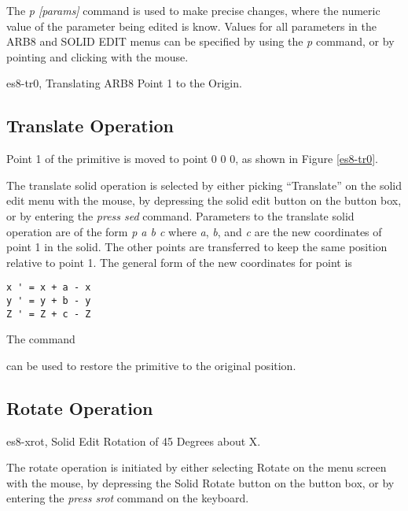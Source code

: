 The {\em p [params]} command is used to
make precise changes, where the numeric value of the parameter being
edited is know.
Values for all parameters in the ARB8
and SOLID EDIT menus can be specified by using the {\em p} command,
or by pointing and clicking with the mouse.

\mfig es8-tr0, Translating ARB8 Point 1 to the Origin.
\subsection{Translate Operation}


Point 1 of the primitive is moved to point 0 0 0,
as shown in Figure \ref{es8-tr0}.

The translate solid operation is selected
by either picking ``Translate'' on the solid edit menu
with the mouse, by depressing the solid edit button on the button box,
or by entering the {\em press sed} command.
Parameters to the translate solid operation
are of the form {\em p a b c}
where {\em a}, {\em b}, and {\em c} are the new coordinates
of point 1 in the solid.
The other points are transferred to keep the same position
relative to point 1.
The general form of the new coordinates for point is

\begin{center}
\begin{verbatim}
x ' = x + a - x
y ' = y + b - y
Z ' = Z + c - Z
\end{verbatim}
\end{center}

The command


can be used to restore the primitive to the original position.

\subsection{Rotate Operation}
\mfig es8-xrot, Solid Edit Rotation of 45 Degrees about X.

The rotate operation is initiated by either selecting Rotate on the menu
screen with the mouse,
by depressing the Solid Rotate button on the button box,
or by entering the {\em press srot} command on the keyboard.

